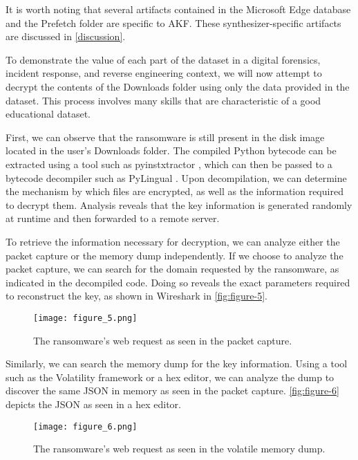 It is worth noting that several artifacts contained in the Microsoft
Edge database and the Prefetch folder are specific to AKF. These
synthesizer-specific artifacts are discussed in \autoref{discussion}.

To demonstrate the value of each part of the dataset in a digital
forensics, incident response, and reverse engineering context, we will
now attempt to decrypt the contents of the Downloads folder using only
the data provided in the dataset. This process involves many skills that
are characteristic of a good educational dataset.

First, we can observe that the ransomware is still present in the disk
image located in the user's Downloads folder. The compiled Python
bytecode can be extracted using a tool such as pyinstxtractor
\citep{extremecodersExtremecodersrePyinstxtractor2025}, which can
then be passed to a bytecode decompiler such as PyLingual
\citep{wiedemeierPYLINGUALPerfectDecompilation2024}. Upon
decompilation, we can determine the mechanism by which files are
encrypted, as well as the information required to decrypt them. Analysis
reveals that the key information is generated randomly at runtime and
then forwarded to a remote server.

To retrieve the information necessary for decryption, we can analyze
either the packet capture or the memory dump independently. If we choose
to analyze the packet capture, we can search for the domain requested by
the ransomware, as indicated in the decompiled code. Doing so reveals
the exact parameters required to reconstruct the key, as shown in
Wireshark in \autoref{fig:figure-5}.

\begin{figure}[htbp]
\centering
\texttt{[image: figure\_5.png]}
\caption{The ransomware's web request as seen in the packet
capture.}\label{fig:figure-5}
\end{figure}

Similarly, we can search the memory dump for the key information. Using
a tool such as the Volatility framework or a hex editor, we can analyze
the dump to discover the same JSON in memory as seen in the packet
capture. \autoref{fig:figure-6} depicts the JSON as seen in a hex
editor.

\begin{figure}[htbp]
\centering
\texttt{[image: figure\_6.png]}
\caption{The ransomware's web request as seen in the volatile memory
dump.}\label{fig:figure-6}
\end{figure}


